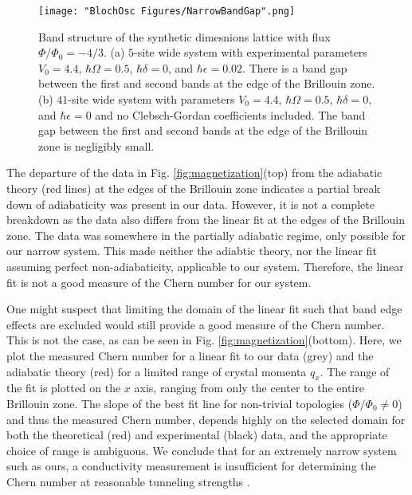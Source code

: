 \begin{figure}
\texttt{[image: "BlochOsc Figures/NarrowBandGap".png]}
\caption[Band structure of the synthetic dimesnions lattice with flux $\Phi/\Phi_0=-4/3$ ]{Band structure of the synthetic dimesnions lattice with flux $\Phi/\Phi_0=-4/3$. (a) $5$-site wide system with experimental parameters $V_0=4.4$, $\hbar\Omega = 0.5$, $\hbar\delta=0$, and $\hbar\epsilon = 0.02$. There is a band gap between the first and second bands at the edge of the Brillouin zone. (b) $41$-site wide system with parameters $V_0=4.4$, $\hbar\Omega = 0.5$, $\hbar\delta=0$, and $\hbar\epsilon = 0$ and no Clebsch-Gordan coefficients included. The band gap between the first and second bands at the edge of the Brillouin zone is negligibly small. }
\label{fig:narrowBandGap}
\end{figure}

The departure of the data in Fig. \ref{fig:magnetization}(top) from the adiabatic theory (red lines) at the edges of the Brillouin zone indicates a partial break down of adiabaticity was present in our data. However, it is not a complete breakdown as the data also differs from the linear fit at the edges of the Brillouin zone. The data was somewhere in the partially adiabatic regime, only possible for our narrow system. This made neither the adiabtic theory, nor the linear fit assuming perfect non-adiabaticity, applicable to our system. Therefore, the linear fit is not a good measure of the Chern number for our system.

One might suspect that limiting the domain of the linear fit such that band edge effects are excluded would still provide a good measure of the Chern number. This is not the case, as can be seen in Fig. \ref{fig:magnetization}(bottom). Here, we plot the measured Chern number for a linear fit to our data (grey) and the adiabatic theory (red) for a limited range of crystal momenta $q_x$. The range of the fit is plotted on the $x$ axis, ranging from only the center to the entire Brillouin zone.  The slope of the best fit line for non-trivial topologies ($\Phi/\Phi_0\neq0$) and thus the measured Chern number, depends highly on the selected domain for both the theoretical (red) and experimental (black) data, and the appropriate choice of range is ambiguous. We conclude that for an extremely narrow system such as ours, a conductivity measurement is insufficient for determining the Chern number at reasonable tunneling strengths \cite{Mugel2017}. 


